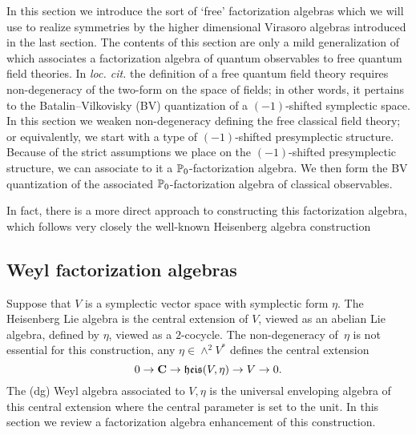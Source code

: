 \documentclass[11pt]{amsart}
\begin{document}
In this section we introduce the sort of `free' factorization algebras which we will use to realize symmetries by the higher dimensional Virasoro algebras introduced in the last section.
The contents of this section are only a mild generalization of \cite[\S 8.1]{CG2} which associates a factorization algebra of quantum observables to free quantum field theories.
In \textit{loc. cit.} the definition of a free quantum field theory requires non-degeneracy of the two-form on the space of fields; in other words, it pertains to the Batalin--Vilkovisky (BV) quantization of a $(-1)$-shifted symplectic space. 
In this section we weaken non-degeneracy defining the free classical field theory; or equivalently, we start with a type of $(-1)$-shifted presymplectic structure.
Because of the strict assumptions we place on the $(-1)$-shifted presymplectic structure, we can associate to it a $\mathbb P_0$-factorization algebra.
We then form the BV quantization of the associated $\mathbb P_0$-factorization algebra of classical observables.

In fact, there is a more direct approach to constructing this factorization algebra, which follows very closely the well-known Heisenberg algebra construction

\subsection{Weyl factorization algebras}
\label{ss:weyl}

Suppose that $V$ is a symplectic vector space with symplectic form $\eta$.
The Heisenberg Lie algebra is the central extension of $V$, viewed as an abelian Lie algebra, defined by $\eta$, viewed as a $2$-cocycle.
The non-degeneracy of~$\eta$ is not essential for this construction, any $\eta \in \wedge^2 V^*$ defines the central extension
\begin{equation}
0 \to \mathbf{C} \to \mathfrak{heis}(V,\eta) \to V \to 0 .
\end{equation}
The (dg) Weyl algebra associated to $V,\eta$ is the universal enveloping algebra of this central extension where the central parameter is set to the unit.
In this section we review a factorization algebra enhancement of this construction.
\end{document}
